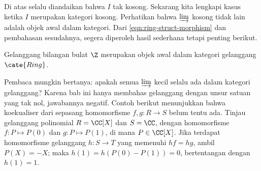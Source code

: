 Di atas selalu diandaikan bahwa $I$ tak kosong. Sekarang kita lengkapi kasus ketika $I$ merupakan kategori kosong. Perhatikan bahwa $\varinjlim$ kosong tidak lain adalah objek awal dalam kategori. Dari \eqref{eqn:ring-struct-morphism} dan pembahasan sesudahnya, segera diperoleh hasil sederhana tetapi penting berikut.
\begin{proposition}
	Gelanggang bilangan bulat $\Z$ merupakan objek awal dalam kategori gelanggang $\cate{Ring}$.
\end{proposition}

Pembaca mungkin bertanya: apakah semua $\varinjlim$ kecil selalu ada dalam kategori gelanggang? Karena bab ini hanya membahas gelanggang dengan unsur satuan yang tak nol, jawabannya negatif. Contoh berikut menunjukkan bahwa koekualiser dari sepasang homomorfisme $f,g: R \to S$ belum tentu ada. Tinjau gelanggang polinomial $R = \CC[X]$ dan $S = \CC$, dengan homomorfisme $f: P \mapsto P(0)$ dan $g: P \mapsto P(1)$, di mana $P \in \CC[X]$. Jika terdapat homomorfisme gelanggang $h: S \to T$ yang memenuhi $hf=hg$, ambil $P(X)=-X$; maka $h(1) = h(P(0)-P(1)) = 0$, bertentangan dengan $h(1)=1$.

